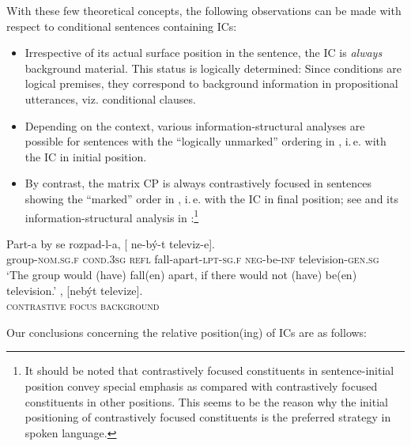 \documentclass[output=paper,colorlinks,citecolor=brown,
modfonts,newtxmath
]{langscibook}
\begin{document}
With these few theoretical concepts, the following observations can be made with respect to conditional sentences containing ICs:

\begin{itemize}

\item Irrespective of its actual surface position in the sentence, the IC is \textit{always} background material. This status is logically determined: Since conditions are logical premises, they correspond to background information in propositional utterances, viz. conditional clauses.

\item Depending on the context, various information-structural analyses are possible for sentences with the ``logically unmarked'' ordering in , i.\,e. with the IC in initial position.
 
\item By contrast, the matrix CP is always contrastively focused in sentences showing the ``marked'' order in , i.\,e. with the IC in final position; see  and its information-structural analysis in :\footnote{It should be noted that contrastively focused constituents in sentence-initial position convey special emphasis as compared with contrastively focused constituents in other positions. This seems to be the reason why the initial positioning of contrastively focused constituents is the preferred strategy in spoken language.}

\end{itemize}

\ea\label{ex:television}
\ea\label{ex:television-a}
\gll Part-a by se rozpad-l-a, [\hspace{-2pt} ne-bý-t televiz-e].\\
     group-\textsc{nom.sg.f} \textsc{cond.3sg} \textsc{refl} {fall-apart}-\textsc{lpt-sg.f} {} \textsc{neg}-be-\textsc{inf} television-\textsc{gen.sg}\\
\glt `The group would (have) fall(en) apart, if there would not (have) be(en) television.' \hfill \citep[Czech;][4]{Milotova2012}
\ex\label{ex:television-b}
, {[nebýt televize].}\\
	{\textsc{contrastive focus}}	{\textsc{background}}\\
\z
\z

\noindent Our conclusions concerning the relative position(ing) of ICs are as follows:
\end{document}
